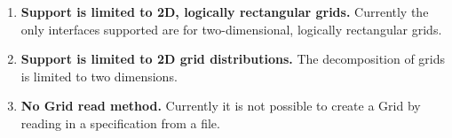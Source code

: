 

\begin{enumerate}

\item {\bf Support is limited to 2D, logically rectangular grids.} 
Currently the only interfaces supported are for two-dimensional, 
logically rectangular grids. 

\item {\bf Support is limited to 2D grid distributions.} The 
decomposition of grids is limited to two dimensions.

\item {\bf No Grid read method.} Currently it is not possible to 
create a Grid by reading in a specification from a file.

\end{enumerate}


